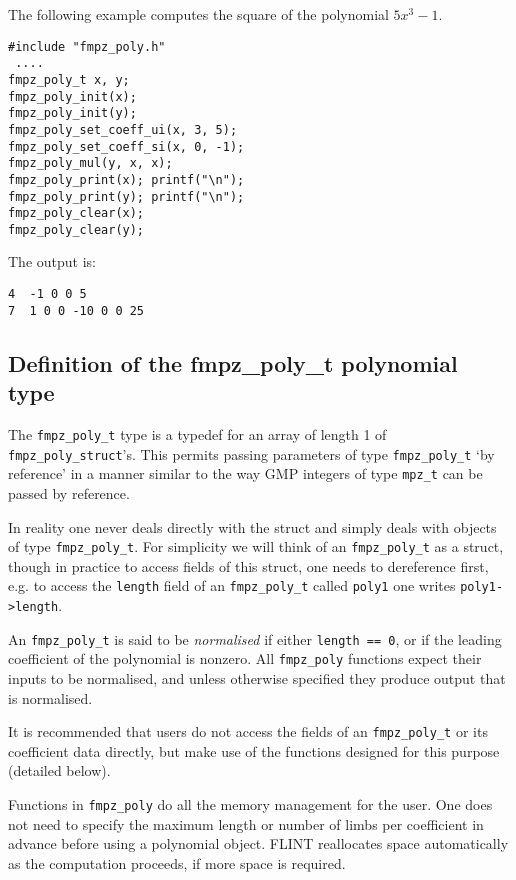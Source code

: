 \documentclass[a4paper,10pt]{article}
\newcommand{\code}{\lstinline}
\begin{document}
The following example computes the square of the polynomial $5x^3 - 1$.

\begin{lstlisting}
#include "fmpz_poly.h"
 ....
fmpz_poly_t x, y;
fmpz_poly_init(x);
fmpz_poly_init(y);
fmpz_poly_set_coeff_ui(x, 3, 5);
fmpz_poly_set_coeff_si(x, 0, -1);
fmpz_poly_mul(y, x, x);
fmpz_poly_print(x); printf("\n");
fmpz_poly_print(y); printf("\n");
fmpz_poly_clear(x);
fmpz_poly_clear(y);
\end{lstlisting}

The output is:

\begin{lstlisting}
4  -1 0 0 5
7  1 0 0 -10 0 0 25
\end{lstlisting}

\subsection{Definition of the fmpz\_poly\_t polynomial type}

The \code{fmpz_poly_t} type is a typedef for an array of length 1 of \code{fmpz_poly_struct}'s. This permits passing parameters  of type \code{fmpz_poly_t} `by reference' in a manner similar to the way GMP integers of type \code{mpz_t} can be passed by reference. 

In reality one never deals directly with the struct and simply deals with objects of type \code{fmpz_poly_t}. For simplicity we will think of an \code{fmpz_poly_t} as a struct, though in practice to access fields of this struct, one needs to dereference first, e.g. to access the \code{length} field of an \code{fmpz_poly_t} called \code{poly1} one writes \code{poly1->length}. 

An \code{fmpz_poly_t} is said to be \emph{normalised} if either \code{length == 0}, or if the leading coefficient of the polynomial is nonzero. All \code{fmpz_poly} functions expect their inputs to be normalised, and unless otherwise specified they produce output that is normalised. 

It is recommended that users do not access the fields of an \code{fmpz_poly_t} or its coefficient data directly, but make use of the functions designed for this purpose (detailed below).

Functions in \code{fmpz_poly} do all the memory management for the user. One does not need to specify the maximum length or number of limbs per coefficient in advance before using a polynomial object. FLINT reallocates space automatically as the computation proceeds, if more space is required. 
\end{document}
